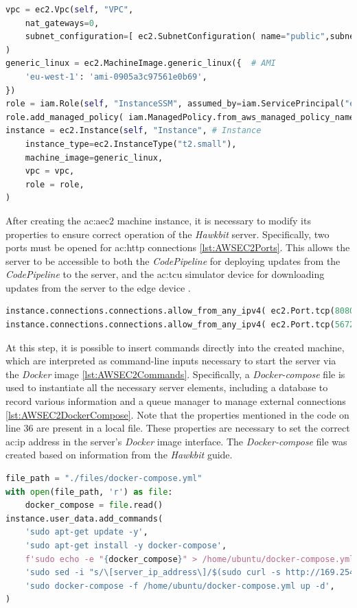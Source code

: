 \begin{lstlisting}[language=Python, caption={Code for the creation the \textit{EC2 Hawkbit} server istance}, label=lst:AWSEC2Istance]
vpc = ec2.Vpc(self, "VPC",
    nat_gateways=0,
    subnet_configuration=[ ec2.SubnetConfiguration( name="public",subnet_type=ec2.SubnetType.PUBLIC ) ]
)
generic_linux = ec2.MachineImage.generic_linux({  # AMI
    'eu-west-1': 'ami-0905a3c97561e0b69',
})
role = iam.Role(self, "InstanceSSM", assumed_by=iam.ServicePrincipal("ec2.amazonaws.com")) 
role.add_managed_policy( iam.ManagedPolicy.from_aws_managed_policy_name( "AmazonSSMManagedInstanceCore" ) )
instance = ec2.Instance(self, "Instance", # Instance
    instance_type=ec2.InstanceType("t2.small"),
    machine_image=generic_linux,
    vpc = vpc,
    role = role,
)
\end{lstlisting}

After creating the \gls{ac:aec2} machine instance, it is necessary to modify its properties to ensure correct operation of the \textit{Hawkbit} server. Specifically, two ports must be opened for \gls{ac:http} connections \ref{lst:AWSEC2Ports}. This allows the server to be accessible to both the \textit{CodePipeline} for deploying updates from the \textit{CodePipeline} to the server, and the \gls{ac:tcu} simulator device for downloading updates from the server to the edge device \cite{HawkbitDockerCompose}.
\begin{lstlisting}[language=Python, caption={Code for opening the doors}, label=lst:AWSEC2Ports]
instance.connections.connections.allow_from_any_ipv4( ec2.Port.tcp(8080), "Allow inbound HTTP traffic" )
instance.connections.connections.allow_from_any_ipv4( ec2.Port.tcp(5672), "Allow inbound HTTP traffic" )
\end{lstlisting}

At this step, it is possible to insert commands directly into the created machine, which are interpreted as command-line inputs necessary to start the server via the \textit{Docker} image \ref{lst:AWSEC2Commands}. Specifically, a \textit{Docker-compose} file is used to instantiate all the necessary server elements, including a database to record various information and a queue manager to manage external connections \ref{lst:AWSEC2DockerCompose}. Note that the properties mentioned in the code on line 36 are present in a local file. These properties are necessary to set the correct \gls{ac:ip} address in the server's \textit{Docker} image interface. The \textit{Docker-compose} file was created based on information from the \textit{Hawkbit} guide.
\begin{lstlisting}[language=Python, caption={Code to run commands on the machine}, label=lst:AWSEC2Commands]
file_path = "./files/docker-compose.yml"
with open(file_path, 'r') as file:
    docker_compose = file.read()
instance.user_data.add_commands(
    'sudo apt-get update -y',
    'sudo apt-get install -y docker-compose',
    f'sudo echo -e "{docker_compose}" > /home/ubuntu/docker-compose.yml',
    'sudo sed -i "s/\[server_ip_address\]/$(sudo curl -s http://169.254.169.254/latest/meta-data/public-ipv4)/g" /home/ubuntu/docker-compose.yml',
    'sudo docker-compose -f /home/ubuntu/docker-compose.yml up -d',
)
\end{lstlisting}

